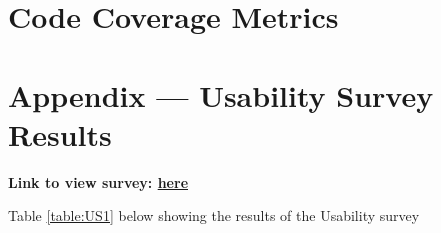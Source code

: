 \documentclass[12pt, titlepage]{article}
\begin{document}
\section{Code Coverage Metrics}




\newpage{}
\section*{Appendix --- Usability Survey Results}

\textbf{Link to view survey: \href{https://docs.google.com/forms/d/e/1FAIpQLSdlrjJkx5uAdkjsMwDsV0cWCIpfhzvdnSnNukdR0-1SlWtrtA/viewform?usp=dialog}{here}}

Table \ref{table:US1} below showing the results of the Usability survey
\end{document}
